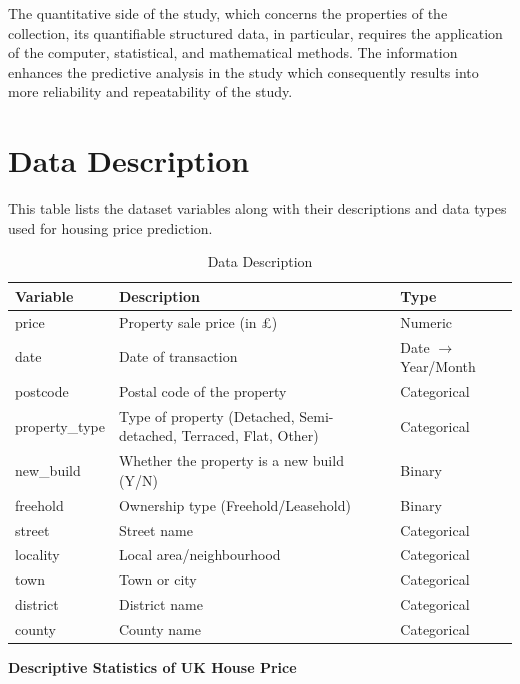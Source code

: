 \documentclass[12pt, a4paper, oneside]{book}
\begin{document}
The quantitative side of the study, which concerns the properties of the collection, its quantifiable structured data, in particular, requires the application of the computer, statistical, and mathematical methods. The information enhances the predictive analysis in the study which consequently results into more reliability and repeatability of the study.


\section{Data Description}


\textbf{}


\textbf{}


This table lists the dataset variables along with their descriptions and data types used for housing price prediction.

\begin{table}[htbp]
\centering
\caption{Data Description}
\label{tab:data_description}
\begin{tabular}{|p{3cm}|p{6cm}|p{3cm}|}
\hline
\textbf{Variable} & \textbf{Description} & \textbf{Type} \\
\hline
price & Property sale price (in £) & Numeric \\
\hline
date & Date of transaction & Date $\rightarrow$ Year/Month \\
\hline
postcode & Postal code of the property & Categorical \\
\hline
property\_type & Type of property (Detached, Semi-detached, Terraced, Flat, Other) & Categorical \\
\hline
new\_build & Whether the property is a new build (Y/N) & Binary \\
\hline
freehold & Ownership type (Freehold/Leasehold) & Binary \\
\hline
street & Street name & Categorical \\
\hline
locality & Local area/neighbourhood & Categorical \\
\hline
town & Town or city & Categorical \\
\hline
district & District name & Categorical \\
\hline
county & County name & Categorical \\
\hline
\end{tabular}
\end{table}


\textbf{}


\textbf{}


\textbf{Descriptive Statistics of UK House Price}
\end{document}
